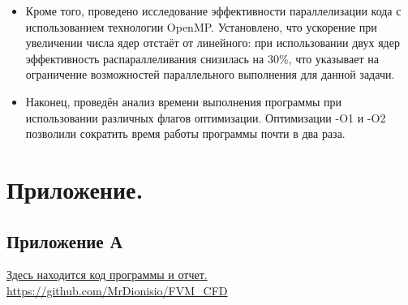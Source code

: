 \begin{itemize}
    \item Кроме того, проведено исследование эффективности параллелизации кода с использованием технологии OpenMP. Установлено, что ускорение при увеличении числа ядер отстаёт от линейного: при использовании двух ядер эффективность распараллеливания снизилась на 30\%, что указывает на ограничение возможностей параллельного выполнения для данной задачи.
    
    \item Наконец, проведён анализ времени выполнения программы при использовании различных флагов оптимизации. Оптимизации -O1 и -O2 позволили сократить время работы программы почти в два раза.
\end{itemize}


\section{Приложение.}
\subsection{Приложение А}
\href{https://github.com/MrDionisio/FVM_CFD}{Здесь находится код программы и отчет.} \url{https://github.com/MrDionisio/FVM_CFD}

